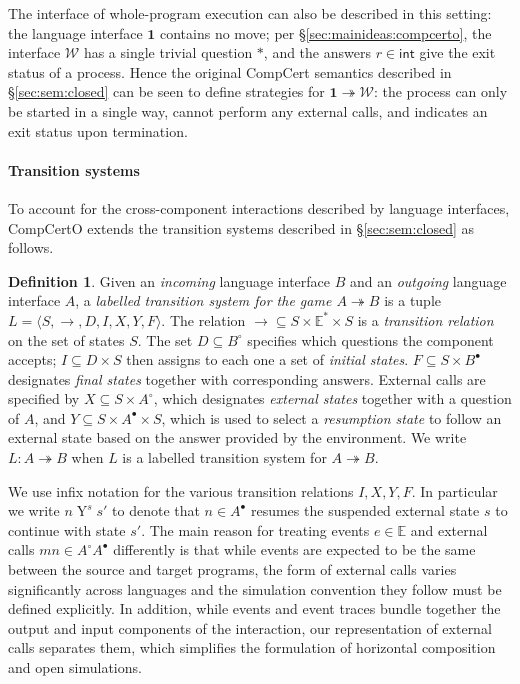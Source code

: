 \documentclass[11pt,oneside,draft]{book}
\theoremstyle{definition}
\newtheorem{definition}[theorem]{Definition}
\newcommand{\kw}[1]{\ensuremath{ \mathsf{#1} }}
\newcommand{\que}{\circ}         %
\newcommand{\ans}{\bullet}       %
\begin{document}
The interface of whole-program execution
can also be described in this setting:
the language interface $\mathbf{1}$ contains no move;
per \S\ref{sec:mainideas:compcerto},
the interface $\mathcal{W}$ has a single trivial question $*$,
and the answers $r \in \kw{int}$
give the exit status of a process.
Hence the original CompCert semantics described in
\S\ref{sec:sem:closed}
can be seen to define strategies for
$\mathbf{1} \twoheadrightarrow \mathcal{W}$:
the process can only be started in a single way,
cannot perform any external calls,
and indicates an exit status upon termination.


\paragraph{Transition systems} %

To account for the cross-component interactions
described by language interfaces,
CompCertO extends
the transition systems described in \S\ref{sec:sem:closed}
as follows.

\begin{definition} \label{def:lts}
Given an \emph{incoming} language interface $B$
and an \emph{outgoing} language interface $A$,
a \emph{labelled transition system for the game $A \twoheadrightarrow B$}
is a tuple $L = \langle S, \rightarrow, D, I, X, Y, F \rangle$.
The relation
${\rightarrow} \subseteq S \times \mathbb{E}^* \times S$ is
a \emph{transition relation} on the set of states $S$.
The set $D \subseteq B^\que$ specifies which
questions the component accepts;
$I \subseteq D \times S$ then
assigns to each one a set of \emph{initial states}.
$F \subseteq S \times B^\ans$
designates \emph{final states} together with corresponding answers.
External calls are specified by
$X \subseteq S \times A^\que$,
which designates \emph{external states} together with
a question of $A$, and
$Y \subseteq S \times A^\ans \times S$,
which is used to select a \emph{resumption state}
to follow an external state
based on the answer provided by the environment.
We write $L : A \twoheadrightarrow B$ when
$L$ is a labelled transition system for $A \twoheadrightarrow B$.
\end{definition}

We use infix notation for the various transition relations
$I, X, Y, F$.
In particular we write $n \mathrel{Y}^s s'$
to denote that $n \in A^\ans$
resumes the suspended external state $s$
to continue with state $s'$.
%
The main reason for treating
events $e \in \mathbb{E}$ and
external calls $m n \in A^\que A^\ans$
differently is that
while events are expected to be the same
between the source and target programs,
the form of external calls varies significantly
across languages
and the simulation convention they follow
must be defined explicitly.
In addition,
while events and event traces
bundle together the output and input
components of the interaction,
our representation of external calls
separates them,
which simplifies the formulation of
horizontal composition and open simulations.
\end{document}
